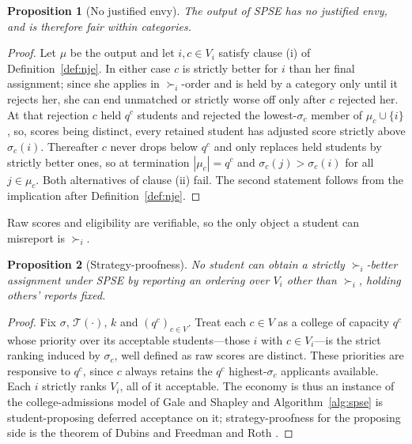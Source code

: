 \documentclass[a4paper,twoside]{article}
\newtheorem{proposition}{Proposition}
\theoremstyle{definition}
\renewcommand{\T}{\mathcal{T}}
\begin{document}
\begin{proposition}[No justified envy]
\label{prop:spse-nje}
The output of SPSE has no justified envy, and is therefore fair within categories.
\end{proposition}

\begin{proof}
Let $\mu$ be the output and let $i,c\in V_i$ satisfy clause (i) of Definition~\ref{def:nje}. In either case $c$ is strictly better for $i$ than her final assignment; since she applies in $\succ_i$-order and is held by a category only until it rejects her, she can end unmatched or strictly worse off only after $c$ rejected her. At that rejection $c$ held $q^c$ students and rejected the lowest-$\sigma_c$ member of $\mu_c\cup\{i\}$, so, scores being distinct, every retained student has adjusted score strictly above $\sigma_c(i)$. Thereafter $c$ never drops below $q^c$ and only replaces held students by strictly better ones, so at termination $|\mu_c|=q^c$ and $\sigma_c(j)>\sigma_c(i)$ for all $j\in\mu_c$. Both alternatives of clause (ii) fail. The second statement follows from the implication after Definition~\ref{def:nje}.
\end{proof}

Raw scores and eligibility are verifiable, so the only object a student can misreport is $\succ_i$.

\begin{proposition}[Strategy-proofness]
\label{prop:spse-sp}
No student can obtain a strictly $\succ_i$-better assignment under SPSE by reporting an ordering over $V_i$ other than $\succ_i$, holding others' reports fixed.
\end{proposition}

\begin{proof}
Fix $\sigma$, $\T(\cdot)$, $k$ and $(q^c)_{c\in V}$. Treat each $c\in V$ as a college of capacity $q^c$ whose priority over its acceptable students---those $i$ with $c\in V_i$---is the strict ranking induced by $\sigma_c$, well defined as raw scores are distinct. These priorities are responsive to $q^c$, since $c$ always retains the $q^c$ highest-$\sigma_c$ applicants available. Each $i$ strictly ranks $V_i$, all of it acceptable. The economy is thus an instance of the college-admissions model of Gale and Shapley \cite{GaSh62a} and Algorithm~\ref{alg:spse} is student-proposing deferred acceptance on it; strategy-proofness for the proposing side is the theorem of Dubins and Freedman \cite{DuFr81a} and Roth \cite{Roth82a}.
\end{proof}
\end{document}
